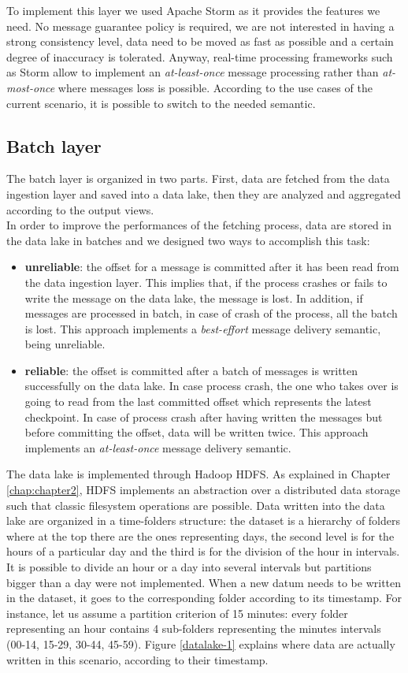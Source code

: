 To implement this layer we used Apache Storm as it provides the features we need. No message guarantee policy is required, we are not interested in having a strong consistency level, data need to be moved as fast as possible and a certain degree of inaccuracy is tolerated. Anyway, real-time processing frameworks such as Storm allow to implement an \textit{at-least-once} message processing rather than \textit{at-most-once} where messages loss is possible. According to the use cases of the current scenario, it is possible to switch to the needed semantic.

\subsection{Batch layer}
\label{batch-layer1}
The batch layer is organized in two parts. First, data are fetched from the data ingestion layer and saved into a data lake, then they are analyzed and aggregated according to the output views.\\
In order to improve the performances of the fetching process, data are stored in the data lake in batches and we designed two ways to accomplish this task:
\begin{itemize}
\item \textbf{unreliable}: the offset for a message is committed after it has been read from the data ingestion layer. This implies that, if the process crashes or fails to write the message on the data lake, the message is lost. In addition, if messages are processed in batch, in case of crash of the process, all the batch is lost. This approach implements a \textit{best-effort} message delivery semantic, being unreliable.
\item \textbf{reliable}: the offset is committed after a batch of messages is written successfully on the data lake. In case process crash, the one who takes over is going to read from the last committed offset which represents the latest checkpoint. In case of process crash after having written the messages but before committing the offset, data will be written twice. This approach implements an \textit{at-least-once} message delivery semantic.
\end{itemize}
The data lake is implemented through Hadoop HDFS. As explained in Chapter \ref{chap:chapter2}, HDFS implements an abstraction over a distributed data storage such that classic filesystem operations are possible. Data written into the data lake are organized in a time-folders structure: the dataset is a hierarchy of folders where at the top there are the ones representing days, the second level is for the hours of a particular day and the third is for the division of the hour in intervals. It is possible to divide an hour or a day into several intervals but partitions bigger than a day were not implemented. When a new datum needs to be written in the dataset, it goes to the corresponding folder according to its timestamp. For instance, let us assume a partition criterion of 15 minutes: every folder representing an hour contains 4 sub-folders representing the minutes intervals (00-14, 15-29, 30-44, 45-59). Figure \ref{datalake-1} explains where data are actually written in this scenario, according to their timestamp.


